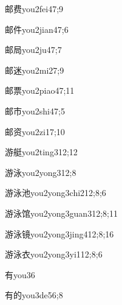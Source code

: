 \begin{verbete}{邮费}{you2fei4}{7;9}
\end{verbete}
\begin{verbete}{邮件}{you2jian4}{7;6}
\end{verbete}
\begin{verbete}{邮局}{you2ju4}{7;7}
\end{verbete}
\begin{verbete}{邮迷}{you2mi2}{7;9}
\end{verbete}
\begin{verbete}{邮票}{you2piao4}{7;11}
\end{verbete}
\begin{verbete}{邮市}{you2shi4}{7;5}
\end{verbete}
\begin{verbete}{邮资}{you2zi1}{7;10}
\end{verbete}
\begin{verbete}{游艇}{you2ting3}{12;12}
\end{verbete}
\begin{verbete}{游泳}{you2yong3}{12;8}
\end{verbete}
\begin{verbete}{游泳池}{you2yong3chi2}{12;8;6}
\end{verbete}
\begin{verbete}{游泳馆}{you2yong3guan3}{12;8;11}
\end{verbete}
\begin{verbete}{游泳镜}{you2yong3jing4}{12;8;16}
\end{verbete}
\begin{verbete}{游泳衣}{you2yong3yi1}{12;8;6}
\end{verbete}
\begin{verbete}{有}{you3}{6}
\end{verbete}
\begin{verbete}{有的}{you3de5}{6;8}
\end{verbete}
